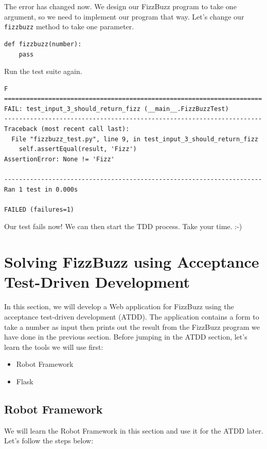 \documentclass{article}
\begin{document}
\noindent The error has changed now. We design our FizzBuzz program to take one
argument, so we need to implement our program that way. Let's change our {\tt
fizzbuzz} method to take one parameter.

\begin{verbatim}
def fizzbuzz(number):
    pass
\end{verbatim}

\noindent Run the test suite again.

\begin{verbatim}
F
======================================================================
FAIL: test_input_3_should_return_fizz (__main__.FizzBuzzTest)
----------------------------------------------------------------------
Traceback (most recent call last):
  File "fizzbuzz_test.py", line 9, in test_input_3_should_return_fizz
    self.assertEqual(result, 'Fizz')
AssertionError: None != 'Fizz'

----------------------------------------------------------------------
Ran 1 test in 0.000s

FAILED (failures=1)
\end{verbatim}

\noindent Our test fails now! We can then start the TDD process. Take your
time. :-)

\section*{Solving FizzBuzz using Acceptance Test-Driven Development}

\noindent In this section, we will develop a Web application for FizzBuzz using
the acceptance test-driven development (ATDD). The application contains a form
to take a number as input then prints out the result from the FizzBuzz program
we have done in the previous section. Before jumping in the ATDD section, let's
learn the tools we will use first:

\begin{itemize}
  \item Robot Framework
  \item Flask
\end{itemize}

\subsection*{Robot Framework}

\noindent We will learn the Robot Framework in this section and use it for the
ATDD later. Let's follow the steps below:
\end{document}
